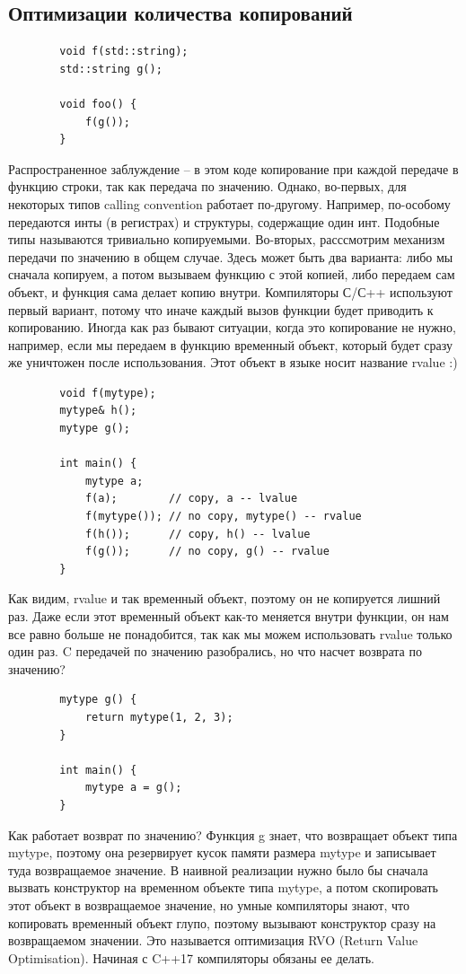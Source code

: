 \documentclass[12pt, a4paper]{article}
\begin{document}
	\subsection{Оптимизации количества копирований}
	\begin{verbatim}
		void f(std::string);
		std::string g();
		
		void foo() {
			f(g());
		}
	\end{verbatim}
	Распространенное заблуждение -- в этом коде копирование при каждой передаче в функцию строки, так как передача по значению. Однако, во-первых, для некоторых типов calling convention работает по-другому. Например, по-особому передаются инты (в регистрах) и структуры, содержащие один инт. Подобные типы называются тривиально копируемыми. Во-вторых, расссмотрим механизм передачи по значению в общем случае. Здесь может быть два варианта: либо мы сначала копируем, а потом вызываем функцию с этой копией, либо передаем сам объект, и функция сама делает копию внутри. Компиляторы С/С++ используют первый вариант, потому что иначе каждый вызов функции будет приводить к копированию. Иногда как раз бывают ситуации, когда это копирование не нужно, например, если мы передаем в функцию временный объект, который будет сразу же уничтожен после использования. Этот объект в языке носит название rvalue :)
	\begin{verbatim}
		void f(mytype);
		mytype& h();
		mytype g();
		
		int main() {
			mytype a;
			f(a);        // copy, a -- lvalue
			f(mytype()); // no copy, mytype() -- rvalue
			f(h());      // copy, h() -- lvalue
			f(g());      // no copy, g() -- rvalue
		}
	\end{verbatim}
	Как видим, rvalue и так временный объект, поэтому он не копируется лишний раз. Даже если этот временный объект как-то меняется внутри функции, он нам все равно больше не понадобится, так как мы можем использовать rvalue только один раз. C передачей по значению разобрались, но что насчет возврата по значению?
	\begin{verbatim}
		mytype g() {
			return mytype(1, 2, 3);
		}
		
		int main() {
			mytype a = g();
		}
	\end{verbatim}
	Как работает возврат по значению? Функция g знает, что возвращает объект типа mytype, поэтому она резервирует кусок памяти размера mytype и записывает туда возвращаемое значение. В наивной реализации нужно было бы сначала вызвать конструктор на временном объекте типа mytype, а потом скопировать этот объект в возвращаемое значение, но умные компиляторы знают, что копировать временный объект глупо, поэтому вызывают конструктор сразу на возвращаемом значении. Это называется оптимизация RVO (Return Value Optimisation). Начиная с C++17 компиляторы обязаны ее делать.\\
\end{document}
